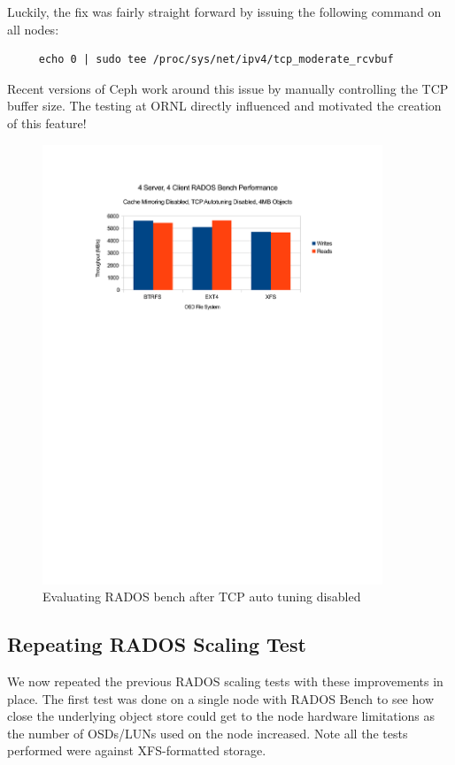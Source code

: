 \documentclass{article}
\begin{document}
Luckily, the fix was fairly straight forward by issuing the following command on all nodes:

\begin{Verbatim}
     echo 0 | sudo tee /proc/sys/net/ipv4/tcp_moderate_rcvbuf
\end{Verbatim}

Recent versions of Ceph work around this issue by manually controlling the TCP
buffer size.  The testing at ORNL directly influenced and motivated the creation
of this feature!

\begin{figure}[htb]
\centering
\includegraphics[width=4.0in]{rados-after-ddn-tcptune}
\caption{Evaluating RADOS bench after TCP auto tuning disabled}
\label{fig:rados-tcp-auto-disabled}
\end{figure}




\subsection{Repeating RADOS Scaling Test}

We now repeated the previous RADOS scaling tests with these improvements in place.
The first test was done on a single node with RADOS Bench to see how close the
underlying object store could get to the node hardware limitations as the number
of OSDs/LUNs used on the node increased. Note all the tests performed were against
XFS-formatted storage.
\end{document}
